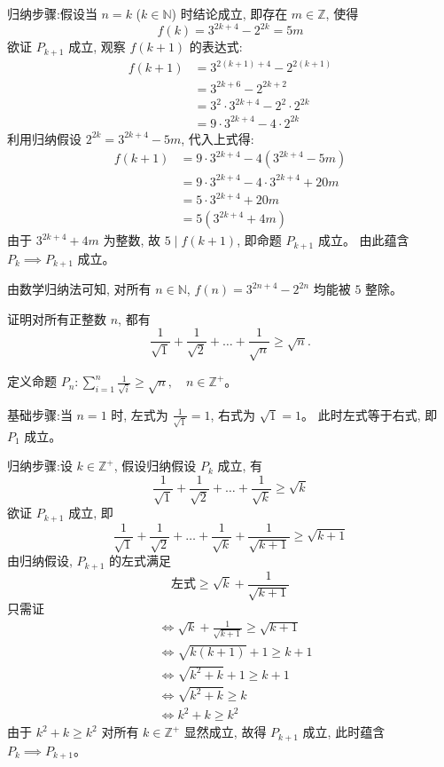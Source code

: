 \begin{questions}
\begin{solution}
        归纳步骤:假设当 $n=k$ ($k \in \mathbb{N}$) 时结论成立, 即存在 $m \in \mathbb{Z}$, 使得
        \[
        f(k) = 3^{2k+4}-2^{2k} = 5m
        \]
        欲证 $P_{k+1}$ 成立, 观察 $f(k+1)$ 的表达式:
        \begin{align}
        f(k+1) &= 3^{2(k+1)+4} - 2^{2(k+1)} \\
        &= 3^{2k+6} - 2^{2k+2} \\
        &= 3^2 \cdot 3^{2k+4} - 2^2 \cdot 2^{2k} \\
        &= 9 \cdot 3^{2k+4} - 4 \cdot 2^{2k}
        \end{align}
        利用归纳假设 $2^{2k} = 3^{2k+4} - 5m$, 代入上式得:
        \begin{align}
        f(k+1) &= 9 \cdot 3^{2k+4} - 4(3^{2k+4} - 5m) \\
        &= 9 \cdot 3^{2k+4} - 4 \cdot 3^{2k+4} + 20m \\
        &= 5 \cdot 3^{2k+4} + 20m \\
        &= 5(3^{2k+4} + 4m)
        \end{align}
        由于 $3^{2k+4} + 4m$ 为整数, 故 $5 \mid f(k+1)$, 即命题 $P_{k+1}$ 成立。
        由此蕴含 $P_k \implies P_{k+1}$ 成立。

        由数学归纳法可知, 对所有 $n \in \mathbb{N}$, $f(n) = 3^{2n+4}-2^{2n}$ 均能被 $5$ 整除。
    \end{solution}

    \question 证明对所有正整数 $n$, 都有
    \[
    \frac{1}{\sqrt{1}} + \frac{1}{\sqrt{2}} + \dots + \frac{1}{\sqrt{n}} \ge \sqrt{n}.
    \]
    \begin{solution}
        定义命题 $P_n:\sum_{i=1}^{n} \frac{1}{\sqrt{i}} \ge \sqrt{n}, \quad n \in \mathbb{Z}^{+}$。

        基础步骤:当 $n=1$ 时, 
        左式为 $\frac{1}{\sqrt{1}} = 1$, 右式为 $\sqrt{1} = 1$。
        此时左式等于右式, 即 $P_1$ 成立。

        归纳步骤:设 $k \in \mathbb{Z}^{+}$, 假设归纳假设 $P_k$ 成立, 有
        \[
        \frac{1}{\sqrt{1}} + \frac{1}{\sqrt{2}} + \dots + \frac{1}{\sqrt{k}} \ge \sqrt{k}
        \]
        欲证 $P_{k+1}$ 成立, 即
        \[
        \frac{1}{\sqrt{1}} + \frac{1}{\sqrt{2}} + \dots + \frac{1}{\sqrt{k}} + \frac{1}{\sqrt{k+1}} \ge \sqrt{k+1}
        \]
        由归纳假设, $P_{k+1}$ 的左式满足
        \[
        \text{左式} \ge \sqrt{k} + \frac{1}{\sqrt{k+1}}
        \]
        只需证
        \begin{align}
        &\iff \sqrt{k} + \frac{1}{\sqrt{k+1}} \ge \sqrt{k+1} \\
        &\iff \sqrt{k(k+1)} + 1 \ge k+1 \\
        &\iff \sqrt{k^2+k} + 1 \ge k+1 \\
        &\iff \sqrt{k^2+k} \ge k \\
        &\iff k^2+k \ge k^2
        \end{align}
        由于 $k^2+k \ge k^2$ 对所有 $k \in \mathbb{Z}^{+}$ 显然成立, 故得 $P_{k+1}$ 成立, 此时蕴含 $P_k \implies P_{k+1}$。


\end{solution}
\end{questions}

